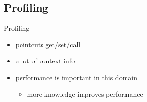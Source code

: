 \subsection*{Profiling}

\begin{frame}{Profiling}
  \begin{itemize}
\item pointcuts get/set/call %
\item a lot of context info  %
\item performance is important in this domain
\begin{itemize}
\item more knowledge improves performance 
\end{itemize}
\end{itemize}
\end{frame}
